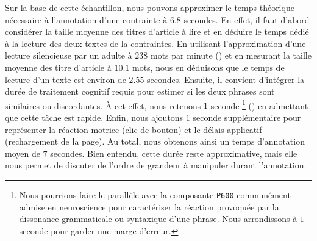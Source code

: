 			Sur la base de cette échantillon, nous pouvons approximer le temps théorique nécessaire à l'annotation d'une contrainte à $6.8$ secondes.
			En effet, il faut d'abord considérer la taille moyenne des titres d'article à lire et en déduire le temps dédié à la lecture des deux textes de la contraintes.
			En utilisant l'approximation d'une lecture silencieuse par un adulte à $238$ mots par minute (\cite{brysbaert:2019:how-many-words}) et en mesurant la taille moyenne des titre d'article à $10.1$ mots, nous en déduisons que le temps de lecture d'un texte est environ de $2.55$ secondes.
			Ensuite, il convient d'intégrer la durée de traitement cognitif requis pour estimer si les deux phrases sont similaires ou discordantes.
			À cet effet, nous retenons $1$ seconde \footnote{
				Nous pourrions faire le parallèle avec la composante \texttt{P600} communément admise en neuroscience pour caractériser la réaction provoquée par la dissonance grammaticale ou syntaxique d'une phrase.
				Nous arrondissons à $1$ seconde pour garder une marge d'erreur.
			} (\cite{purves-brannon:2013:principles-cognitive-neuroscience})
			en admettant que cette tâche est rapide.
			Enfin, nous ajoutons $1$ seconde supplémentaire pour représenter la réaction motrice (clic de bouton) et le délais applicatif (rechargement de la page).
			Au total, nous obtenons ainsi un temps d'annotation moyen de $7$ secondes.
			Bien entendu, cette durée reste approximative, mais elle nous permet de discuter de l'ordre de grandeur à manipuler durant l'annotation.
			
